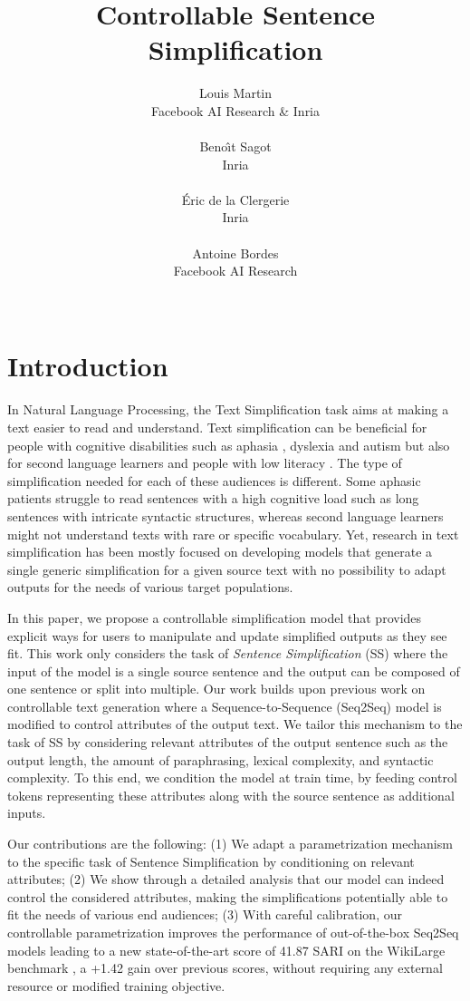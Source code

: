 \documentclass[10pt, a4paper]{article}
\title{Controllable Sentence Simplification}
\author{Louis Martin \\
  Facebook AI Research \& Inria \\
  \email{louismartin@fb.com} \\\And
  Beno{\^\i}t Sagot\\
  Inria\\
  \email{benoit.sagot@inria.fr}\\\And
  \'Eric de la Clergerie\\
  Inria  \\
  \email{eric.de\_la\_clergerie@inria.fr}\\\And
  Antoine Bordes \\
  Facebook AI Research  \\
  \email{abordes@fb.com} \\
  }
\begin{document}
\maketitleabstract

\section{Introduction}

In Natural Language Processing, the Text Simplification task aims at making a text easier to read and understand.
Text simplification can be beneficial for people with cognitive disabilities such as aphasia \cite{carroll1998practical}, dyslexia \cite{rello2013simplify} and autism \cite{evans2014evaluation} but also for second language learners \cite{xia2016text} and people with low literacy \cite{watanabe2009facilita}.
The type of simplification needed for each of these audiences is different.
Some aphasic patients struggle to read sentences with a high cognitive load such as long sentences with intricate syntactic structures, whereas second language learners might not understand texts with rare or specific vocabulary.
Yet, research in text simplification has been mostly focused on developing models that generate a single generic simplification for a given source text with no possibility to adapt outputs for the needs of various target populations.

In this paper, we propose a controllable simplification model that provides explicit ways for users to manipulate and update simplified outputs as they see fit.
This work only considers the task of {\it Sentence Simplification} (SS) where the input of the model is a single source sentence and the output can be composed of one sentence or split into multiple.
Our work builds upon previous work on controllable text generation \cite{kikuchi2016controlling,fan2017controllable,scarton2018learning,nishihara2019controllable} where a Sequence-to-Sequence (Seq2Seq) model is modified to control attributes of the output text.
We tailor this mechanism to the task of SS by considering relevant attributes of the output sentence such as the output length, the amount of paraphrasing, lexical complexity, and syntactic complexity.
To this end, we condition the model at train time, by feeding control tokens representing these attributes along with the source sentence as additional inputs.


Our contributions are the following:
(1) We adapt a parametrization mechanism to the specific task of Sentence Simplification by conditioning on relevant attributes;
(2) We show through a detailed analysis that our model can indeed control the considered attributes, making the simplifications potentially able to fit the needs of various end audiences; (3) With careful calibration, our controllable parametrization improves the performance of out-of-the-box Seq2Seq models leading to a new state-of-the-art score of 41.87 SARI \cite{xu2016optimizing} on the WikiLarge benchmark , a +1.42 gain over previous scores, without requiring any external resource or modified training objective.
\end{document}
